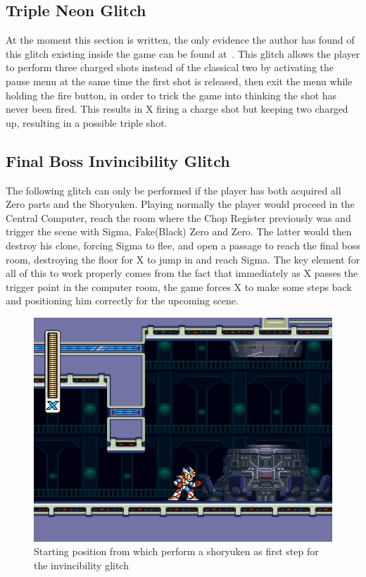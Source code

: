 \subsection{Triple Neon Glitch}
At the moment this section is written, the only evidence the author has found of this glitch existing inside the game can be found at~\cite{video:triple_glitch}. This glitch allows the player to perform three charged shots instead of the classical two by activating the pause menu at the same time the first shot is released, then exit the menu while holding the fire button, in order to trick the game into thinking the shot has never been fired. This results in X firing a charge shot but keeping two charged up, resulting in a possible triple shot.

\subsection{Final Boss Invincibility Glitch}\label{Final_battle_glitch}
The following glitch can only be performed if the player has both acquired all Zero parts and the Shoryuken. Playing normally the player would proceed in the Central Computer, reach the room where the Chop Register previously was and trigger the scene with Sigma, Fake(Black) Zero and Zero. The latter would then destroy his clone, forcing Sigma to flee, and open a passage to reach the final boss room, destroying the floor for X to jump in and reach Sigma. The key element for all of this to work properly comes from the fact that immediately as X passes the trigger point in the computer room, the game forces X to make some steps back and positioning him correctly for the upcoming scene. 
\begin{figure}[htp]
	\centering
	\includegraphics[width=.7\linewidth]{figures/X2/Miscs/Sigma_glitch_start.png}
	\caption{Starting position from which perform a shoryuken as first step for the invincibility glitch}
	\label{X2_sigma_glitch_start}
\end{figure}
